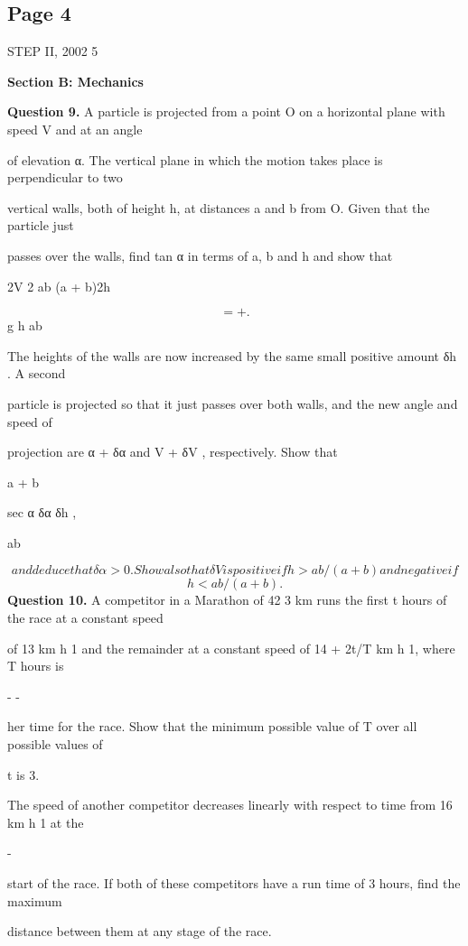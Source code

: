 \documentclass[12pt]{article}
\begin{document}
\subsection*{Page 4}
\begin{flushleft}
STEP II, 2002 5\par
\bigskip\textbf{Section B: Mechanics}\par
\bigskip\textbf{Question 9.} A particle is projected from a point O on a horizontal plane with speed V and at an angle\par
of elevation α. The vertical plane in which the motion takes place is perpendicular to two\par
vertical walls, both of height h, at distances a and b from O. Given that the particle just\par
passes over the walls, find tan α in terms of a, b and h and show that\par
2V 2 ab (a + b)2h\par
\[= + .\]
g h ab\par
The heights of the walls are now increased by the same small positive amount δh . A second\par
particle is projected so that it just passes over both walls, and the new angle and speed of\par
projection are α + δα and V + δV , respectively. Show that\par
a + b\par
sec α δα δh ,\par
\approx ab\par
\[and deduce that δα > 0 . Show also that δV is positive if h > ab/(a + b) and negative if\]
\[h < ab/(a + b) .\]
\bigskip\textbf{Question 10.} A competitor in a Marathon of 42 3 km runs the first t hours of the race at a constant speed\par
of 13 km h 1 and the remainder at a constant speed of 14 + 2t/T km h 1, where T hours is\par
- -\par
her time for the race. Show that the minimum possible value of T over all possible values of\par
t is 3.\par
The speed of another competitor decreases linearly with respect to time from 16 km h 1 at the\par
-\par
start of the race. If both of these competitors have a run time of 3 hours, find the maximum\par
distance between them at any stage of the race.\par

\end{flushleft}
\end{document}
